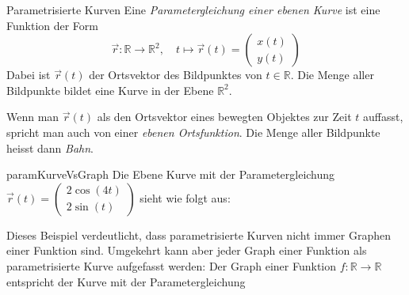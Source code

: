 \begin{definition}
    {Parametrisierte Kurven}{}
    Eine \emph{Parametergleichung einer ebenen Kurve} ist eine Funktion der Form
    \[
        \vec{r}: \mathbb{R} \to \mathbb{R}^2, \quad t \mapsto \vec{r}(t) = \begin{pmatrix}
            x(t) \\
            y(t)
        \end{pmatrix}
    \]
    Dabei ist \( \vec{r}(t) \) der Ortsvektor des Bildpunktes von \( t \in \mathbb{R} \). Die Menge aller Bildpunkte bildet eine Kurve in der Ebene \( \mathbb{R}^2 \).

    Wenn man \( \vec{r}(t) \) als den Ortsvektor eines bewegten Objektes zur Zeit \( t \) auffasst, spricht man auch von einer \emph{ebenen Ortsfunktion}. Die Menge aller Bildpunkte heisst dann \emph{Bahn}.

\end{definition}
\begin{bsp}{}{paramKurveVsGraph}
    Die Ebene Kurve mit der Parametergleichung \( \vec{r}(t) = \begin{pmatrix}
        2\cos(4t) \\ 2 \sin(t)
    \end{pmatrix}\) sieht wie folgt aus:
    \begin{center}
    \end{center}

\end{bsp}
Dieses Beispiel verdeutlicht, dass parametrisierte Kurven nicht immer Graphen einer Funktion sind.
Umgekehrt kann aber jeder Graph einer Funktion als parametrisierte Kurve aufgefasst werden: Der Graph einer Funktion \( f: \mathbb{R} \to \mathbb{R} \) entspricht der Kurve mit der Parametergleichung
